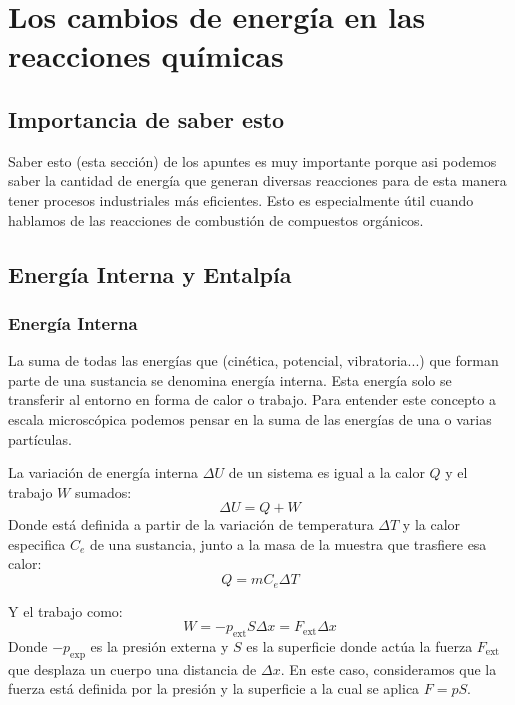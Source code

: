 \documentclass[arial,a4paper,print]{article}
\begin{document}
\section{Los cambios de energía en las reacciones químicas}

\subsection{Importancia de saber esto}
Saber esto (esta sección) de los apuntes es muy importante porque asi podemos saber la cantidad de energía que generan diversas reacciones para de esta manera tener procesos industriales más eficientes. Esto es especialmente útil cuando hablamos de las reacciones de combustión de compuestos orgánicos. 

\subsection{Energía Interna y Entalpía}
\subsubsection{Energía Interna}
La suma de todas las energías que (cinética, potencial, vibratoria...) que forman parte de una sustancia se denomina energía interna. Esta energía solo se transferir al entorno en forma de calor o trabajo. Para entender este concepto a escala microscópica podemos pensar en la suma de las energías de una o varias partículas. 

La variación de energía interna $\Delta U$ de un sistema es igual a la calor $Q$ y el trabajo $W$ sumados:
\begin{equation*}
	\Delta U = Q + W
\end{equation*}
Donde está definida a partir de la variación de temperatura $\Delta T$ y la calor especifica $C_{e}$ de una sustancia, junto a la masa de la muestra que trasfiere esa calor:
\begin{equation*}
	Q = mC_{e}\Delta T
\end{equation*}

Y el trabajo como:
\begin{equation*}
	W = -p_{\text{ext}}S\Delta x = F_{\text{ext}}\Delta x
\end{equation*}
Donde $-p_{\text{exp}}$ es la presión externa y $S$ es la superficie donde actúa la fuerza $F_{\text{ext}}$ que desplaza un cuerpo una distancia de $\Delta x$. En este caso, consideramos que la fuerza está definida por la presión y la superficie a la cual se aplica $F=pS$. 
\end{document}
